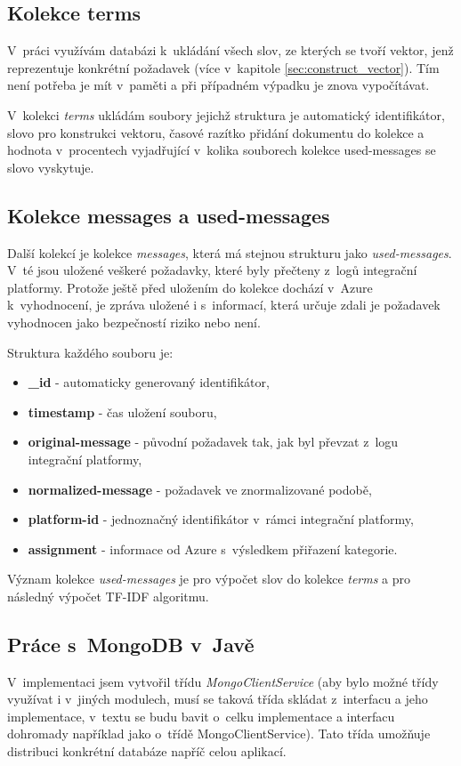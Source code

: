 \documentclass[thesis=M,czech]{FITthesis}[2012/10/20]
\begin{document}
	
	\subsection{Kolekce terms}
		V~práci využívám databázi k~ukládání všech slov, ze kterých se tvoří vektor, jenž reprezentuje konkrétní požadavek (více v~kapitole \ref{sec:construct_vector}). Tím není potřeba je mít v~paměti a při případném výpadku je znova vypočítávat.
	
		V~kolekci \textit{terms} ukládám soubory jejichž struktura je automatický identifikátor, slovo pro konstrukci vektoru, časové razítko přidání dokumentu do kolekce a hodnota v~procentech vyjadřující v~kolika souborech kolekce used-messages se slovo vyskytuje.
	
	\subsection{Kolekce messages a used-messages}
		Další kolekcí je kolekce \textit{messages}, která má stejnou strukturu jako \textit{used-messages}. V~té jsou uložené veškeré požadavky, které byly přečteny z~logů integrační platformy. Protože ještě před uložením do kolekce dochází v~Azure k~vyhodnocení, je zpráva uložené i s~informací, která určuje zdali je požadavek vyhodnocen jako bezpečností riziko nebo není. 
	
		Struktura každého souboru je: 
	
		\begin{itemize} 
			\item \textbf{\_id} - automaticky generovaný identifikátor,
			\item \textbf{timestamp} - čas uložení souboru,
			\item \textbf{original-message} - původní požadavek tak, jak byl převzat z~logu integrační platformy,
			\item \textbf{normalized-message} - požadavek ve znormalizované podobě,
			\item \textbf{platform-id} - jednoznačný identifikátor v~rámci integrační platformy,
			\item \textbf{assignment} - informace od Azure s~výsledkem přiřazení kategorie. 	
		\end{itemize}
	
		Význam kolekce \textit{used-messages} je pro výpočet slov do kolekce \textit{terms} a pro následný výpočet TF-IDF algoritmu.

	\subsection{Práce s~MongoDB v~Javě}
		V~implementaci jsem vytvořil třídu \textit{MongoClientService} (aby bylo možné třídy využívat i v~jiných modulech, musí se taková třída skládat z~interfacu a jeho implementace, v~textu se budu bavit o~celku implementace a interfacu dohromady například jako o~třídě MongoClientService). Tato třída umožňuje distribuci konkrétní databáze napříč celou aplikací. 
	
\end{document}
